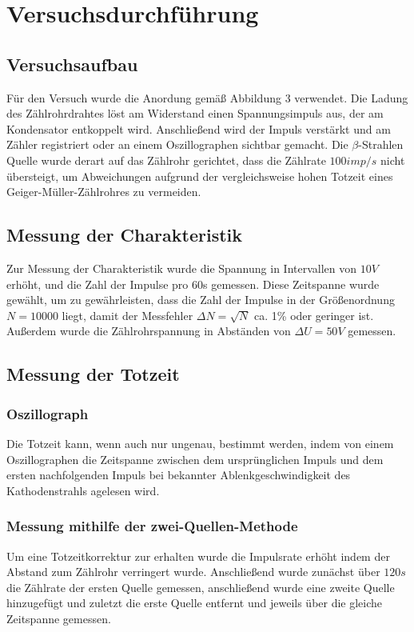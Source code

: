 \section{Versuchsdurchführung}
\subsection{Versuchsaufbau}
Für den Versuch wurde die Anordung gemäß Abbildung 3 verwendet. Die Ladung des Zählrohrdrahtes löst am Widerstand einen Spannungsimpuls aus, der am Kondensator entkoppelt wird. Anschließend wird der Impuls verstärkt und am Zähler registriert oder an einem Oszillographen sichtbar gemacht. Die $\beta$-Strahlen Quelle wurde derart auf das Zählrohr gerichtet, dass die Zählrate $100imp/s$ nicht übersteigt, um Abweichungen aufgrund der vergleichsweise hohen Totzeit eines Geiger-Müller-Zählrohres zu vermeiden.
\subsection{Messung der Charakteristik}
Zur Messung der Charakteristik wurde die Spannung in Intervallen von $10V$ erhöht, und die Zahl der Impulse pro 60s gemessen. Diese Zeitspanne wurde gewählt, um zu gewährleisten, dass die Zahl der Impulse in der Größenordnung $N=10000$  liegt, damit der Messfehler $\Delta N=\sqrt{N}$ ca. 1\% oder geringer ist. Außerdem wurde die Zählrohrspannung in Abständen von $\Delta U=50V$ gemessen.
\subsection{Messung der Totzeit}
\subsubsection{Oszillograph}
Die Totzeit kann, wenn auch nur ungenau, bestimmt werden, indem von einem Oszillographen die Zeitspanne zwischen dem ursprünglichen Impuls und dem ersten nachfolgenden Impuls bei bekannter Ablenkgeschwindigkeit des Kathodenstrahls agelesen wird.
\subsubsection{Messung mithilfe der zwei-Quellen-Methode}
Um eine Totzeitkorrektur zur erhalten wurde die Impulsrate erhöht indem der Abstand zum Zählrohr verringert wurde. Anschließend wurde zunächst über $120s$  die Zählrate der ersten Quelle gemessen, anschließend wurde eine zweite Quelle hinzugefügt und zuletzt die erste Quelle entfernt und jeweils über die gleiche Zeitspanne gemessen.
